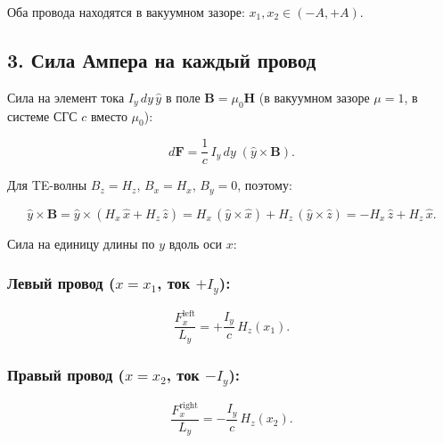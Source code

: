 \documentclass[11pt]{article}
\begin{document}
Оба провода находятся в вакуумном зазоре: \(x_1, x_2 \in (-A, +A)\).

    \subsection{3. Сила Ампера на каждый
провод}\label{ux441ux438ux43bux430-ux430ux43cux43fux435ux440ux430-ux43dux430-ux43aux430ux436ux434ux44bux439-ux43fux440ux43eux432ux43eux434}

Сила на элемент тока \(I_y\,dy\,\hat{y}\) в поле
\(\mathbf{B} = \mu_0 \mathbf{H}\) (в вакуумном зазоре \(\mu = 1\), в
системе СГС \(c\) вместо \(\mu_0\)):

\begin{equation*}
    d\mathbf{F} = \frac{1}{c}\,I_y\,dy\;(\hat{y} \times \mathbf{B}).
\end{equation*}

Для TE-волны \(B_z = H_z\), \(B_x = H_x\), \(B_y = 0\), поэтому:

\begin{equation*}
    \hat{y} \times \mathbf{B}
    = \hat{y} \times (H_x\,\hat{x} + H_z\,\hat{z})
    = H_x\,(\hat{y}\times\hat{x}) + H_z\,(\hat{y}\times\hat{z})
    = -H_x\,\hat{z} + H_z\,\hat{x}.
\end{equation*}

Сила на единицу длины по \(y\) вдоль оси \(x\):

\subsubsection{\texorpdfstring{Левый провод (\(x = x_1\), ток
\(+I_y\)):}{Левый провод (x = x\_1, ток +I\_y):}}\label{ux43bux435ux432ux44bux439-ux43fux440ux43eux432ux43eux434-x-x_1-ux442ux43eux43a-i_y}

\begin{equation*}
    \frac{F_x^{\mathrm{left}}}{L_y}
    = +\frac{I_y}{c}\,H_z(x_1).
\end{equation*}

\subsubsection{\texorpdfstring{Правый провод (\(x = x_2\), ток
\(-I_y\)):}{Правый провод (x = x\_2, ток -I\_y):}}\label{ux43fux440ux430ux432ux44bux439-ux43fux440ux43eux432ux43eux434-x-x_2-ux442ux43eux43a--i_y}

\begin{equation*}
    \frac{F_x^{\mathrm{right}}}{L_y}
    = -\frac{I_y}{c}\,H_z(x_2).
\end{equation*}
\end{document}

